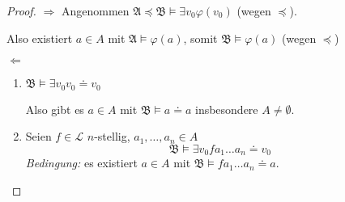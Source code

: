 \documentclass[12pt,parskip=full]{scrartcl}
\newcommand{\heading}{\underline}
\theoremstyle{definition}
\begin{document}
	\begin{proof}
		\heading{$\Rightarrow$} Angenommen $\mathfrak{A} \preccurlyeq \mathfrak{B} \models \exists v_0 \varphi(v_0)$ (wegen $\preccurlyeq$).
		
		Also existiert $a \in A$ mit $\mathfrak{A} \models \varphi(a)$, somit $\mathfrak{B} \models \varphi(a)$ (wegen $\preccurlyeq$)
		
		\heading{$\Leftarrow$} 
		\begin{enumerate}
			\item $\mathfrak{B} \models \exists v_0 v_0 \doteq v_0$
		
			Also gibt es $a \in A$ mit $\mathfrak{B} \models a \doteq a$ insbesondere $A \neq \emptyset$.
			
			\item Seien $f \in \mathcal{L}$ $n$-stellig, $a_1, \dots, a_n \in A$
			\begin{equation*}
				\mathfrak{B} \models \exists v_0 f a_1 \dots a_n \doteq v_0
			\end{equation*}
			\textit{Bedingung:} es existiert $a \in A$ mit $\mathfrak{B} \models f a_1 \dots a_n \doteq a$.
			

\end{enumerate}
\end{proof}
\end{document}
